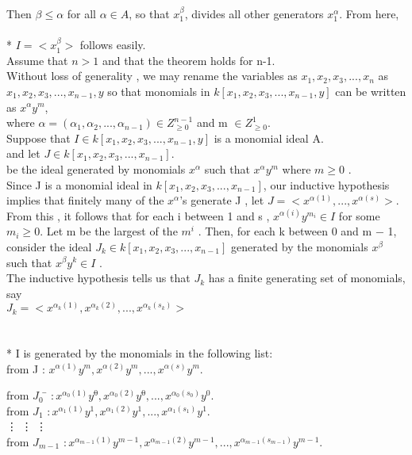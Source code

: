 \documentclass[12pt]{article}
\begin{document}
Then $\beta \leq \alpha$ for all $\alpha \in A$, so that $x_{1}^{\beta}$, divides all other generators $x_{1}^{\alpha}$. From here,\\\\*
$I = < x_{1}^{\beta} >$ follows easily.\\
Assume that $n > 1$ and that  the theorem holds for n-1.\\
Without loss of generality , we may rename the variables as $x_{1},x_{2},x_{3},...,x_{n}$ as
$x_{1},x_{2},x_{3},...,x_{n-1},y$ so that monomials in $k[x_{1},x_{2},x_{3},...,x_{n-1},y]$ can be written as 
$x^{\alpha}y^{m}$,\\where $\alpha = (\alpha_{1},\alpha_{2},...,\alpha_{n-1}) \in Z^{n-1}_{\geq 0}$ and m $ \in  Z^{1}_{\geq 0}$.\\
Suppose that $I \in k[x_{1},x_{2},x_{3},...,x_{n-1},y]$ is a monomial ideal A.\\
and let $J \in k[x_{1},x_{2},x_{3},...,x_{n-1}]$.\\
be the ideal generated by monomials $x^{\alpha}$ such that $x^{\alpha}y^{m}$ where $m \geq 0$ .\\
Since J is a monomial ideal in $k[x_{1},x_{2},x_{3},...,x_{n-1}]$, our inductive hypothesis 
implies that finitely many of the $x^{\alpha}$’s generate J , let
$J = < x^{\alpha(1)},..., x^{\alpha(s)}>$.\\
From this , it follows that for each i between 1 and s ,  $x^{\alpha(i)} y^{m_{i}} \in I$ for some 
$m_{i} \geq 0$. Let m be the largest of the $m^{i}$ . Then, for each k between 0 and m − 1, consider 
the ideal $J_{k} \in k[x_{1},x_{2},x_{3},...,x_{n-1}]$ generated by the monomials $x^{\beta}$ such that $x^{\beta} y^{k} \in I$ . \\
The inductive hypothesis tells us that $J_{k}$ has a finite generating set of monomials, say \\
$J_{k}= <x^{\alpha_{k}(1)},x^{\alpha_{k}(2)},...,x^{\alpha_{k}(s_{k})}>$\\
\newpage
{}\\\\*
I is generated by the monomials in the following list:\\
from J : $x^{\alpha(1)}y^{m},x^{\alpha(2)}y^{m},...,x^{\alpha(s)}y^{m}$.\\
\begin{tabbing}
from $J_{0}$ \hspace{14 pt}\= $: x^{\alpha_{0}(1)}y^{0}$\=$,x^{\alpha_{0}(2)}y^{0}$\=$,...,x^{\alpha_{0}(s_{0})}y^{0}$.\\
from $J_{1}$ \> $: x^{\alpha_{1}(1)}y^{1},x^{\alpha_{1}(2)}y^{1},...,x^{\alpha_{1}(s_{1})}y^{1}$.\\
\> \vdots \> \vdots \> \vdots \\
from $J_{m-1}$ \> $: x^{\alpha_{m-1}(1)}y^{m-1},x^{\alpha_{m-1}(2)}y^{m-1},...,x^{\alpha_{m-1}(s_{m-1})}y^{m-1}$.\\
\end{tabbing}
\end{document}
